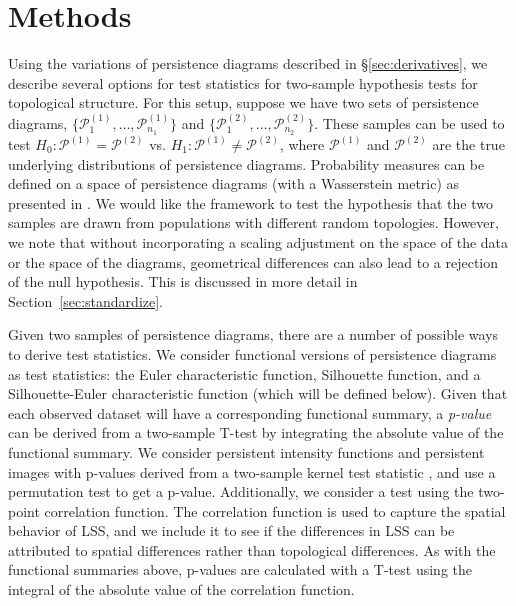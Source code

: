 \documentclass[12pt]{article}
\begin{document}

\section{Methods} \label{sec:methods}
\begin{sloppypar}
Using the variations of persistence diagrams described in \S \ref{sec:derivatives},
we describe several options for test statistics for two-sample hypothesis tests for topological structure.
For this setup, suppose we have two sets of persistence diagrams, $\{\mathcal P_1^{(1)}, \ldots, \mathcal P_{n_1}^{(1)}\}$ and $\{\mathcal P_1^{(2)}, \ldots, \mathcal P_{n_2}^{(2)}\}$.  These samples can be used to test $H_0: \mathcal
P^{(1)} = \mathcal P^{(2)}$ vs. $H_1: \mathcal P^{(1)} \neq \mathcal P^{(2)}$, where $\mathcal P^{(1)}$ and $\mathcal P^{(2)}$ are the true underlying distributions of persistence diagrams.  Probability measures can be defined on a space of persistence diagrams (with a Wasserstein metric) as presented in \citep{Mileyko:2011aa}. We would like the framework to test the hypothesis that the two samples are drawn from populations with different random topologies. However, we note that without incorporating a scaling adjustment on the space  of the data or the space of the diagrams, geometrical differences can also lead to a rejection of the null hypothesis. This is discussed in more detail in Section~\ref{sec:standardize}.
\end{sloppypar}

Given two samples of persistence diagrams, there are a number of possible ways to derive test statistics. We consider functional versions of persistence diagrams as test statistics:  the Euler characteristic function, Silhouette function, and a Silhouette-Euler characteristic function (which will be defined below).
Given that each observed dataset will have a corresponding functional summary, a \emph{p-value} can be derived from a two-sample T-test by integrating the absolute value of the functional summary.
We consider persistent intensity functions and persistent images with p-values derived from a two-sample kernel test statistic \citep{gretton2012kernel}, and use a permutation test to get a p-value.
%
Additionally, we consider a test using the two-point correlation function.  The correlation function is used to capture the spatial behavior of LSS, and we include it to see if the differences in LSS can be attributed to spatial differences rather than topological differences.
As with the functional summaries above, p-values are calculated with a T-test using the integral of the absolute value of the correlation function.
\end{document}
